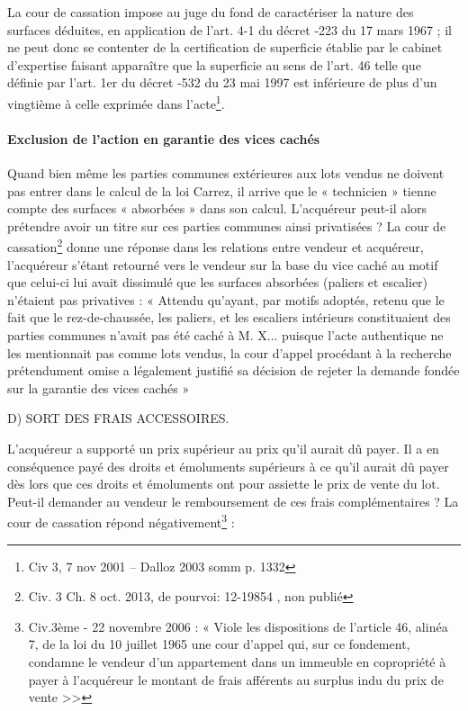 				La cour de cassation impose au juge du fond de caractériser la nature des surfaces déduites, en application
				de l'art. 4-1 du décret -223 du 17 mars 1967 ; il ne peut donc se contenter de la certification de
				superficie établie par le cabinet d'expertise faisant apparaître que la superficie au sens de l'art. 46 telle
				que définie par l'art. 1er du décret -532 du 23 mai 1997 est inférieure de plus d'un vingtième à celle
				exprimée dans l'acte\footnote{Civ 3\ieme{}, 7 nov 2001 – Dalloz 2003 somm p. 1332}.
			
			\paragraph{Exclusion de l’action en garantie des vices cachés}
			
			Quand bien même les parties communes extérieures aux lots vendus ne doivent pas entrer dans le calcul
			de la loi Carrez, il arrive que le « technicien » tienne compte des surfaces « absorbées » dans son calcul.
			L’acquéreur peut-il alors prétendre avoir un titre sur ces parties communes ainsi privatisées ? La cour de
			cassation\footnote{Civ. 3\ieme{} Ch. 8 oct. 2013, \no de pourvoi: 12-19854 , non publié} donne une réponse dans les relations entre vendeur et acquéreur, l’acquéreur s’étant
			retourné vers le vendeur sur la base du vice caché au motif que celui-ci lui avait dissimulé que les surfaces
			absorbées (paliers et escalier) n’étaient pas privatives : « Attendu qu'ayant, par motifs adoptés, retenu
			que le fait que le rez-de-chaussée, les paliers, et les escaliers intérieurs constituaient des parties
			communes n'avait pas été caché à M. X... puisque l'acte authentique ne les mentionnait pas
			comme lots vendus, la cour d'appel procédant à la recherche prétendument omise a légalement
			justifié sa décision de rejeter la demande fondée sur la garantie des vices cachés »
			
			D) SORT DES FRAIS ACCESSOIRES.
			
			L’acquéreur a supporté un prix supérieur au prix qu’il aurait dû payer. Il a en conséquence payé des droits
			et émoluments supérieurs à ce qu’il aurait dû payer dès lors que ces droits et émoluments ont pour
			assiette le prix de vente du lot. Peut-il demander au vendeur le remboursement de ces frais
			complémentaires ? La cour de cassation répond négativement\footnote{
				Civ.3ème - 22 novembre 2006 : « Viole les dispositions de l’article 46, alinéa 7, de la loi du 10 juillet 1965 une cour d’appel qui, sur ce fondement, condamne le vendeur d’un appartement dans un immeuble en copropriété à payer à l’acquéreur le montant de frais afférents au surplus indu du prix de vente >>
			} :
			
